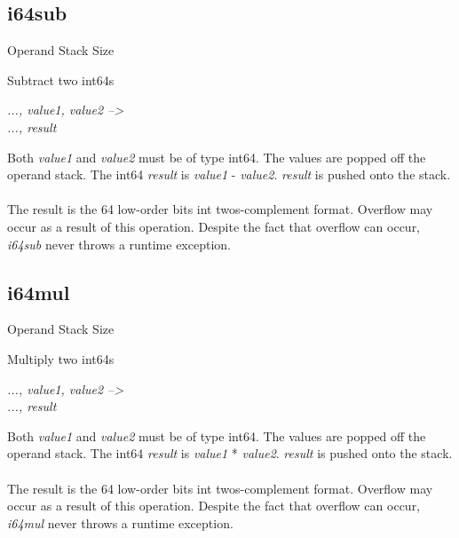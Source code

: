 \documentclass[12pt]{article}
\begin{document}
		\newpage
		
		\subsection*{i64sub}
			\begin{labeling}{Operand Stack Size}
				\item [\textbf{Operation}] Subtract two int64s
				\item [\textbf{Format}] 
				\item [\textbf{Operand Stack}] \textit{..., value1, value2 --\textgreater } \\
										\textit{..., result}
				\item [\textbf{Description}] Both \textit{value1} and \textit{value2} must be of type int64. The values are popped off the operand stack. The int64 \textit{result} is \textit{value1} - \textit{value2}. \textit{result} is pushed onto the stack. \\ \\
				The result is the 64 low-order bits int twos-complement format. 
				Overflow may occur as a result of this operation. Despite the fact that overflow can occur, \textit{i64sub} never throws a runtime exception. 			\end{labeling}		
			
		\newpage
		\subsection*{i64mul}
			\begin{labeling}{Operand Stack Size}
				\item [\textbf{Operation}] Multiply two int64s
				\item [\textbf{Format}] 
				\item [\textbf{Operand Stack}] \textit{..., value1, value2 --\textgreater } \\
										\textit{..., result}
				\item [\textbf{Description}] Both \textit{value1} and \textit{value2} must be of type int64. The values are popped off the operand stack. The int64 \textit{result} is \textit{value1} * \textit{value2}. \textit{result} is pushed onto the stack. \\ \\
				The result is the 64 low-order bits int twos-complement format. 
				Overflow may occur as a result of this operation. Despite the fact that overflow can occur, \textit{i64mul} never throws a runtime exception. 			\end{labeling}		
				
\end{document}
